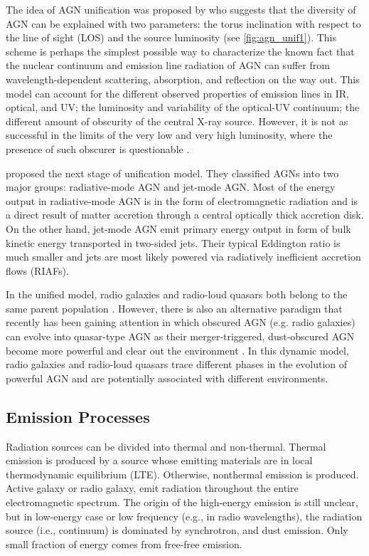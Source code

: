 The idea of AGN unification was proposed by \cite{antonucci1993} who suggests that the diversity of AGN can be explained with two parameters: the torus inclination with respect to the line of sight (LOS) and the source luminosity (see \autoref{fig:agn_unif1}). This scheme is perhaps the simplest possible way to characterize the known fact that the nuclear continuum and emission line radiation of AGN can suffer from wavelength-dependent scattering, absorption, and reflection on the way out. This model can account for the different observed properties of emission lines in IR, optical, and UV; the luminosity and variability of the optical-UV continuum; the different amount of obscurity of the central X-ray source. However, it is not as successful in the limits of the very low and very high luminosity, where the presence of such obscurer is questionable \citep{netzer2013}.  

\cite{heckman2014} proposed the next stage of unification model. They classified AGNs into two major groups: radiative-mode AGN and jet-mode AGN. Most of the energy output in radiative-mode AGN is in the form of electromagnetic radiation and is a direct result of matter accretion through a central optically thick accretion disk. On the other hand, jet-mode AGN emit primary energy output in form of bulk kinetic energy transported in two-sided jets. Their typical Eddington ratio is much smaller and jets are most likely powered via radiatively inefficient accretion flows (RIAFs).

In the unified model, radio galaxies and radio-loud quasars both belong to the same parent population \citep{urry1995}. However, there is also an alternative paradigm that recently has been gaining attention in which obscured AGN (e.g. radio galaxies) can evolve into quasar-type AGN as their merger-triggered, dust-obscured AGN become more powerful and clear out the environment \citep[e.g.,][]{hopkins2006}. In this dynamic model, radio galaxies and radio-loud quasars trace different phases in the evolution of powerful AGN and are potentially associated with different environments.

\subsection{Emission Processes}

Radiation sources can be divided into thermal and non-thermal. Thermal emission is produced by a source whose emitting materials are in local thermodynamic equilibrium (LTE). Otherwise, nonthermal emission is produced. Active galaxy or radio galaxy, emit radiation throughout the entire electromagnetic spectrum. The origin of the high-energy emission is still unclear, but in low-energy case or low frequency (e.g., in radio wavelengths), the radiation source (i.e., continuum) is dominated by synchrotron, and dust emission. Only small fraction of energy comes from free-free emission. 

